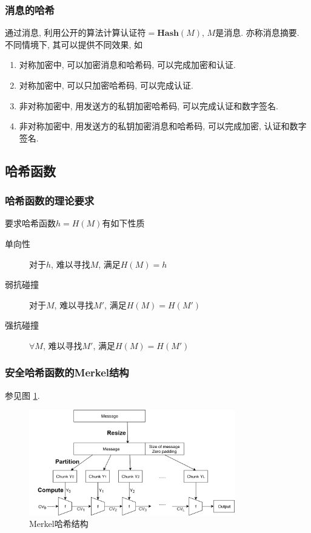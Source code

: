 \documentclass{ctexart}
\begin{document}
\subsubsection{消息的哈希}
    通过消息, 利用公开的算法计算认证符$= \mathbf{Hash}(M)$, $M$是消息. 亦称消息摘要. 
    不同情境下, 其可以提供不同效果, 如\begin{enumerate}
        \item 对称加密中, 可以加密消息和哈希码, 可以完成加密和认证.
        \item 对称加密中, 可以只加密哈希码, 可以完成认证.
        \item 非对称加密中, 用发送方的私钥加密哈希码, 可以完成认证和数字签名.
        \item 非对称加密中, 用发送方的私钥加密消息和哈希码, 可以完成加密, 认证和数字签名.
    \end{enumerate}
\subsection{哈希函数}
\subsubsection{哈希函数的理论要求}
    要求哈希函数$h = H(M)$有如下性质 \begin{description}
        \item[单向性] 对于$h$, 难以寻找$M$, 满足$H(M) = h$
        \item[弱抗碰撞] 对于$M$, 难以寻找$M'$, 满足$H(M) = H(M')$
        \item[强抗碰撞] $\forall M$, 难以寻找$M'$, 满足$H(M) = H(M')$
    \end{description}
\subsubsection{安全哈希函数的Merkel结构} 
    参见图 \ref{merkel-hash}.
    \begin{figure}[ht]
    \vskip 0.2in
    \begin{center}
    \centerline{\includegraphics[width=0.8\textwidth]{merkel-hash}}
    \caption{Merkel哈希结构}
    \label{merkel-hash}
    \end{center}
    \vskip -0.2in
    \end{figure}
\end{document}
